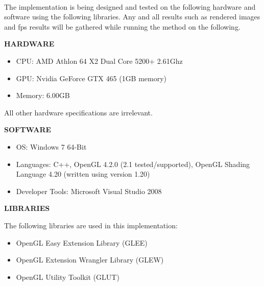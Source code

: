 \paragraph{}
The implementation is being designed and tested on the following hardware and software using the following libraries.  Any and all results such as rendered images and fps results will be gathered while running the method on the following.
\vspace{5 mm}

\textbf{HARDWARE}
\begin{itemize}
\item CPU: AMD Athlon 64 X2 Dual Core 5200+ 2.61Ghz
\item GPU: Nvidia GeForce GTX 465 (1GB memory)
\item Memory: 6.00GB
\end{itemize}

All other hardware specifications are irrelevant.
\vspace{5 mm}

\textbf{SOFTWARE}
\begin{itemize}
\item OS: Windows 7 64-Bit
\item Languages: C++, OpenGL 4.2.0 (2.1 tested/supported), OpenGL Shading Language 4.20 (written using version 1.20)
\item Developer Tools: Microsoft Visual Studio 2008
\end{itemize}
\vspace{5 mm}

\textbf{LIBRARIES}

\vspace{1 mm}

The following libraries are used in this implementation:

\begin{itemize}
\item OpenGL Easy Extension Library (GLEE)
\item OpenGL Extension Wrangler Library (GLEW)
\item OpenGL Utility Toolkit (GLUT)
\end{itemize}


